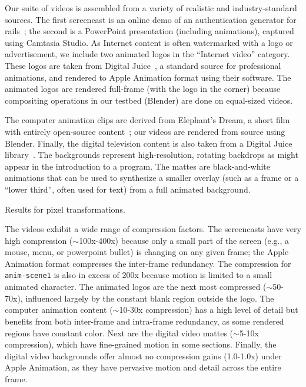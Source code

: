 Our suite of videos is assembled from a variety of realistic and
industry-standard sources.  The first screencast is an online demo of
an authentication generator for rails~\cite{auth-demo}; the second is
a PowerPoint presentation (including animations), captured using
Camtasia Studio.  As Internet content is often watermarked with a logo
or advertisement, we include two animated logos in the ``Internet
video'' category.  These logos are taken from Digital
Juice~\cite{digital-juice}, a standard source for professional
animations, and rendered to Apple Animation format using their
software.  The animated logos are rendered full-frame (with the logo
in the corner) because compositing operations in our testbed (Blender)
are done on equal-sized videos.

The computer animation clips are derived from Elephant's Dream, a
short film with entirely open-source content~\cite{elephants-dream};
our videos are rendered from source using Blender.  Finally, the
digital television content is also taken from a Digital Juice
library~\cite{digital-juice}.  The backgrounds represent
high-resolution, rotating backdrops as might appear in the
introduction to a program.  The mattes are black-and-white animations
that can be used to synthesize a smaller overlay (such as a frame or a
``lower third'', often used for text) from a full animated background.

\begin{table*}[t]
\caption{Results for pixel transformations.
\protect\label{tab:pixel-speedup}}
\end{table*}

The videos exhibit a wide range of compression factors.  The
screencasts have very high compression ($\sim$100x-400x) because only
a small part of the screen (e.g., a mouse, menu, or powerpoint bullet)
is changing on any given frame; the Apple Animation format compresses
the inter-frame redundancy.  The compression for {\tt anim-scene1} is
also in excess of 200x because motion is limited to a small animated
character.  The animated logos are the next most compressed
($\sim$50-70x), influenced largely by the constant blank region
outside the logo.  The computer animation content ($\sim$10-30x
compression) has a high level of detail but benefits from both
inter-frame and intra-frame redundancy, as some rendered regions have
constant color.  Next are the digital video mattes ($\sim$5-10x
compression), which have fine-grained motion in some sections.
Finally, the digital video backgrounds offer almost no compression
gains (1.0-1.0x) under Apple Animation, as they have pervasive motion
and detail across the entire frame.


